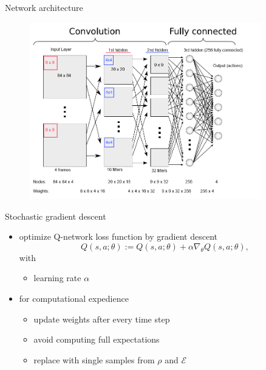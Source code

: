\begin{frame}{Network architecture}
    \begin{figure}
        \centering
        \includegraphics[width=0.9\textwidth]{neural-net.png}
    \end{figure}
\end{frame}

\begin{frame}{Stochastic gradient descent}
    \begin{itemize}\itemsep=12pt

        \item optimize Q-network loss function by gradient descent
        \[
            Q\left(s,a;\theta\right) := Q\left(s,a;\theta\right) + \alpha \nabla_{\theta} Q\left(s,a;\theta\right),
        \]
        with
        \vspace*{0.5em}
        \begin{itemize}
            \item learning rate $\alpha$
        \end{itemize}
        
        \item for computational expedience
        \vspace*{0.5em}
        \begin{itemize}
            \item update weights after every time step
            \item avoid computing full expectations
            \item replace with single samples from $\rho$ and $\mathcal{E}$
        \end{itemize}

    \end{itemize}
\end{frame}

